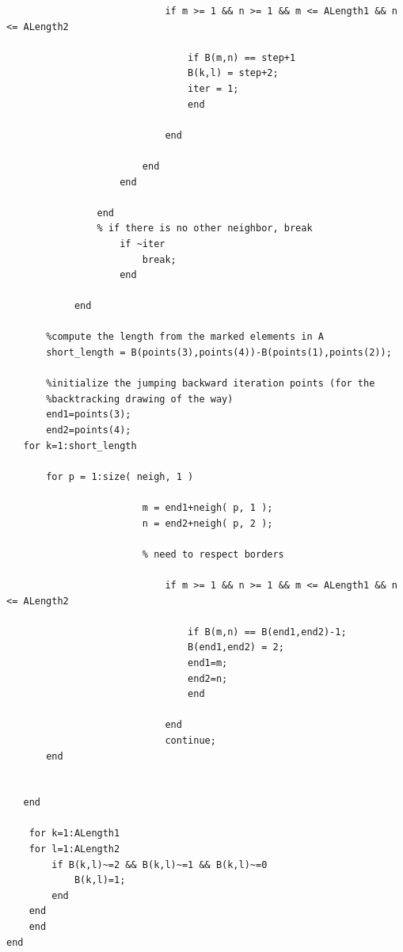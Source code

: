 \documentclass[11pt]{scrartcl}
\begin{document}
\begin{verbatim}
                            if m >= 1 && n >= 1 && m <= ALength1 && n <= ALength2
                                
                                if B(m,n) == step+1
                                B(k,l) = step+2;
                                iter = 1;
                                end
                                
                            end
                        
                        end
                    end
                   
                end
                % if there is no other neighbor, break
                    if ~iter
                        break;
                    end
                
            end
        
       %compute the length from the marked elements in A
       short_length = B(points(3),points(4))-B(points(1),points(2));
       
       %initialize the jumping backward iteration points (for the
       %backtracking drawing of the way)
       end1=points(3);
       end2=points(4);
   for k=1:short_length
      
       for p = 1:size( neigh, 1 )

                        m = end1+neigh( p, 1 );
                        n = end2+neigh( p, 2 );
                    
                        % need to respect borders
                        
                            if m >= 1 && n >= 1 && m <= ALength1 && n <= ALength2
                                
                                if B(m,n) == B(end1,end2)-1;
                                B(end1,end2) = 2;
                                end1=m;
                                end2=n;
                                end
                                
                            end
                            continue;
       end
       
       
   end
   
    for k=1:ALength1
    for l=1:ALength2
        if B(k,l)~=2 && B(k,l)~=1 && B(k,l)~=0
            B(k,l)=1;
        end
    end
    end
end
\end{verbatim}






\end{document}
